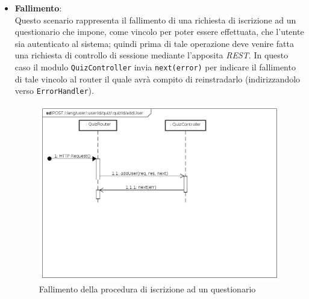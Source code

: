 \begin{itemize}
\item \textbf{Fallimento}:\\
Questo scenario rappresenta il fallimento di una richiesta di iscrizione ad un questionario che impone, come vincolo per poter essere effettuata, che l'utente sia autenticato al sistema; quindi prima di tale operazione deve venire fatta una richiesta di controllo di sessione mediante l'apposita \textit{REST}. In questo caso il modulo \texttt{QuizController} invia \texttt{next(error)} per indicare il fallimento di tale vincolo al router il quale avrà compito di reinstradarlo (indirizzandolo verso \texttt{ErrorHandler}).
\label{Fallimento della procedura di iscrizione ad un questionario}
\begin{figure}[ht]
	\centering
	\includegraphics[scale=0.40]{UML/DiagrammiDiSequenza/Back-end/POST__lang_user_userId_quiz_quizId_addUser_failure.png}
	\caption{Fallimento della procedura di iscrizione ad un questionario}
\end{figure}
\FloatBarrier
\end{itemize}


